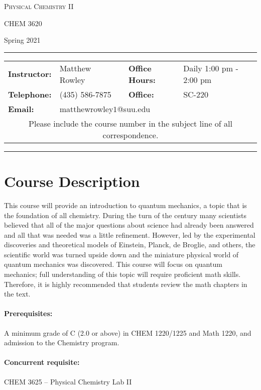 \documentclass[12pt, letterpaper]{article}
\begin{document}
\begin{center}
	{\Large \textsc{Physical Chemistry II}}

	CHEM 3620
\end{center}
\begin{center}
	{\large Spring 2021}
\end{center}
\begin{center}
	\rule{0.85\textwidth}{0.4pt}
	\begin{tabular}{llcll}
		\textbf{Instructor:} & Matthew Rowley                               &  & \textbf{Office Hours:} & Daily 1:00 pm - 2:00 pm \\
		\textbf{Telephone:}  & (435) 586-7875                               &  & \textbf{Office:}       & SC-220                  \\
		\textbf{Email:}      & \multicolumn{3}{l}{matthewrowley$1$@suu.edu}                                                       \\
		\multicolumn{5}{c}{Please include the course number in the subject line of all correspondence.}
	\end{tabular}
	\rule{0.85\textwidth}{0.4pt}
\end{center}

\section*{Course Description}
This course will provide an introduction to quantum mechanics, a topic that is the foundation of all chemistry. During the turn of the  century many scientists believed that all of the major questions about science had already been answered and all that was needed was a little refinement. However, led by the experimental discoveries and theoretical models of Einstein, Planck, de Broglie, and others, the scientific world was turned upside down and the miniature physical world of quantum mechanics was discovered. This course will focus on quantum mechanics; full understanding of this topic will require proficient math skills. Therefore, it is highly recommended that students review the math chapters in the text.

\paragraph{Prerequisites:}
A minimum grade of C (2.0 or above) in CHEM 1220/1225 and Math 1220, and admission to the Chemistry program.

\paragraph{Concurrent requisite:}
CHEM 3625 -- Physical Chemistry Lab II
\end{document}
